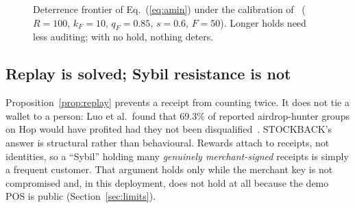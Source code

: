 \documentclass[10.5pt,letterpaper]{article}
\theoremstyle{definition}
\theoremstyle{remark}
\begin{document}
\begin{figure}[!htb]
\centering
{}
\caption{Deterrence frontier of Eq.~(\ref{eq:amin}) under the calibration of~\cite{javarone2026nft} ($R=100$, $k_F=10$, $q_F=0.85$, $s=0.6$, $F=50$). Longer holds need less auditing; with no hold, nothing deters.}
\label{fig:deter}
\end{figure}

\subsection{Replay is solved; Sybil resistance is not}
Proposition~\ref{prop:replay} prevents a receipt from counting twice. It does not tie a wallet to a person: Luo et al.\ found that
69.3\% of reported airdrop-hunter groups on Hop would have profited had they not been disqualified~\cite{luo2025airdrop}. STOCKBACK's
answer is structural rather than behavioural. Rewards attach to receipts, not identities, so a ``Sybil'' holding many
\emph{genuinely merchant-signed} receipts is simply a frequent customer. That argument holds only while the merchant key is not
compromised and, in this deployment, does not hold at all because the demo POS is public (Section~\ref{sec:limits}).
\end{document}
